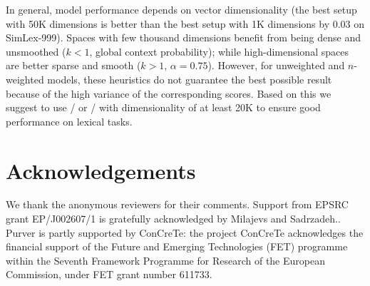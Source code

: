 \documentclass[11pt]{article}
\begin{document}
In general, model performance depends on vector dimensionality (the best setup with 50K dimensions is better than the best setup with 1K dimensions by 0.03 on SimLex-999). Spaces with few thousand dimensions benefit from being dense and unsmoothed  ($k < 1$, global context probability); while high-dimensional spaces are better sparse and smooth  ($k > 1$, $\alpha = 0.75$). However, for unweighted and $n$-weighted models, these heuristics do not guarantee the best possible result because of the high variance of the corresponding scores. Based on this we suggest to use \logNSPMI/ or \logNSCPMI/ with dimensionality of at least 20K to ensure good performance on lexical tasks.

\section{Acknowledgements}

We thank the anonymous reviewers for their comments. Support from EPSRC grant EP/J002607/1 is gratefully acknowledged by Milajevs and Sadrzadeh..
Purver is partly supported by ConCreTe: the project ConCreTe acknowledges the financial support of the Future and Emerging Technologies (FET) programme within the Seventh Framework Programme for Research of the European Commission, under FET grant number 611733.


\balance

\end{document}

